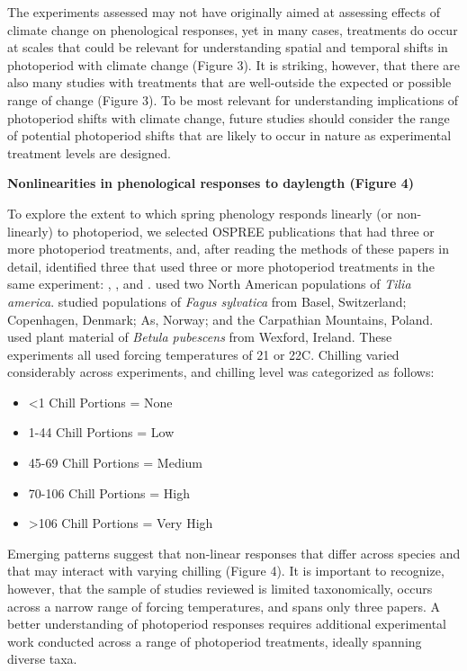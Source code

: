 \documentclass{article}
\begin{document}
\par The experiments assessed may not have originally aimed at assessing effects of climate change on phenological responses, yet in many cases, treatments do occur at scales that could be relevant for understanding spatial and temporal shifts in photoperiod with climate change (Figure 3). It is striking, however, that there are also many studies with treatments that are well-outside the expected or possible range of change (Figure 3).  To be most relevant for understanding implications of photoperiod shifts with climate change, future studies should consider the range of potential photoperiod shifts that are likely to occur in nature as experimental treatment levels are designed.

\par \textbf{Nonlinearities in phenological responses to daylength (Figure 4)}
\par To explore the extent to which spring phenology responds linearly (or non-linearly) to photoperiod, we selected OSPREE publications that had three or more photoperiod treatments, and, after reading the methods of these papers in detail, identified three that used three or more photoperiod treatments in the same experiment: \citet{Ashby:1962aa}, \citet{Heide:1993a}, and \citet{Caffarra:2011b}. \citet{Ashby:1962aa} used two North American populations of \textit{Tilia america}. \citet{Heide:1993a} studied populations of \textit{Fagus sylvatica} from Basel, Switzerland; Copenhagen, Denmark; As, Norway; and the Carpathian Mountains, Poland. \citet{Caffarra:2011b} used plant material of \textit{Betula pubescens} from Wexford, Ireland. These experiments all used forcing temperatures of 21 or 22\degree C. Chilling varied considerably across experiments, and chilling level was categorized as follows:
\begin{itemize}
\item <1 Chill Portions = None
\item 1-44 Chill Portions = Low
\item 45-69 Chill Portions = Medium 
\item 70-106 Chill Portions = High
\item >106 Chill Portions = Very High
\end{itemize}

\par Emerging patterns suggest that non-linear responses that differ across species and that may interact with varying chilling (Figure 4). It is important to recognize, however, that the sample of studies reviewed is limited taxonomically, occurs across a narrow range of forcing temperatures, and spans only three papers. A better understanding of photoperiod responses requires additional experimental work conducted across a range of photoperiod treatments, ideally spanning diverse taxa.
\end{document}
